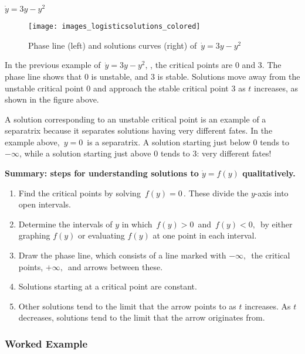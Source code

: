 \begin{example}
  $\dot y = 3y - y^2 $
\end{example}

\begin{figure}[ht!]
  \centering
  \texttt{[image: images\_logisticsolutions\_colored]}
  \caption{Phase line (left) and solutions curves (right) of $\, \dot y = 3y - y^2$}
\end{figure}

In the previous example of $\, \dot y = 3y − y^2,\,$, the critical points are $0$ and $3$.
The phase line shows that $0$ is unstable, and $3$ is stable.
Solutions move away from the unstable critical point $0$
and approach the stable critical point $3$ as $t$ increases, as shown in the figure above.\\

\begin{remark}
  A solution corresponding to an unstable critical point is an example of a separatrix
  because it separates solutions having very different fates.
  In the example above, $\, y = 0\,$ is a separatrix.
  A solution starting just below $0$ tends to $− \infty$,
  while a solution starting just above $0$ tends to $3$: very different fates!
\end{remark}

\textbf{\color{blue} Summary: steps for understanding solutions
  to $\dot y = f(y)$ qualitatively.}

\begin{enumerate}
\item Find the critical points by solving $\,f(y) = 0\,$.
  These divide the $y$-axis into open intervals.
\item Determine the intervals of $y$
  in which $\, f(y)>0 \, $ and $\, f(y)<0,\,$ by either graphing $f(y)$
  or evaluating $f(y)$ at one point in each interval.
\item Draw the phase line,
  which consists of a line marked with $−\infty,\,$ the critical points,
  $+ \infty,\,$ and arrows between these.
\item Solutions starting at a critical point are constant.
\item Other solutions tend to the limit that the arrow points to as $t$ increases.
  As $t$ decreases, solutions tend to the limit that the arrow originates from.
\end{enumerate}

\clearpage

\subsubsection{Worked Example}

